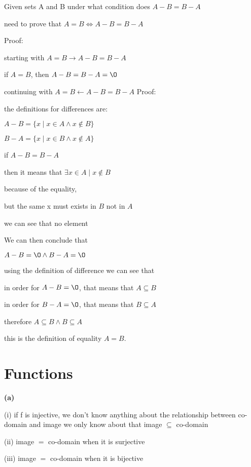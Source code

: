\documentclass[12pts,A4]{article}
\begin{document}
\begin{flushleft}
    Given sets A and B under what condition does $A-B= B-A$ 

    need to prove that $ A=B \iff A-B = B-A $
    

    \bigskip
    Proof:


    starting with $A=B \rightarrow A-B = B-A $
    
    if $A=B$, then $A-B = B-A = \O$
    
    
    \bigskip

    continuing with $A=B \leftarrow A-B = B-A$
    \bigskip
    Proof:
        
        the definitions for differences are:

        \smallskip
        $ A-B = \{x \mid x \in A \wedge x \not\in B\}$

        \smallskip

        $ B-A = \{x \mid x \in B \wedge x \not\in A\}$

        if $A-B = B-A$

        then it means that $\exists x \in A \mid x \not\in B$
        
        because of the equality,


        but the same x must exists in $B$ not in $A$

        we can see that no element 
        
        We can then conclude that

        $A - B = \O \wedge  B- A = \O$

        using the definition of difference we can see that

        in order for $A - B = \O$, that means that $A \subseteq B$
        
        in order for $B - A = \O$, that means that $B \subseteq A$
        
        \bigskip 
        therefore $A \subseteq B \wedge B \subseteq A$

        this is the definition of equality $A = B$.




        

\end{flushleft}


\section{Functions}

\begin{flushleft}
    \textbf{(a)}

    (i) if f is injective, we don't know anything about the relationship between co-domain and image
    we only know about that image $\subseteq$ co-domain

    (ii) image $=$ co-domain when it is surjective

    (iii) image $=$ co-domain when it is bijective 
    
     
\end{flushleft}
\end{document}
